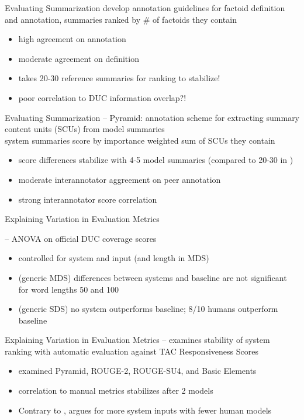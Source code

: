 \documentclass{beamer}
\begin{document}
\begin{frame}{Evaluating Summarization}
\cite{teufel2004evaluating} develop annotation guidelines for factoid 
definition and annotation, summaries ranked by \# of factoids they contain
\begin{itemize}
\item high agreement on annotation
\item moderate agreement on definition
\item takes 20-30 reference summaries for ranking to stabilize!
\item poor correlation to DUC information overlap?!
\end{itemize} 
\end{frame}

\begin{frame}{Evaluating Summarization}
\cite{nenkova2007pyramid} -- Pyramid: annotation scheme for extracting 
    summary content units (SCUs) from model summaries \\
    system summaries score by importance weighted sum of SCUs they contain
\begin{itemize}
\item score differences stabilize with 4-5 model summaries (compared to 
    20-30 in \cite{teufel2004evaluating})
\item moderate interannotator aggreement on peer annotation
\item strong interannotator score correlation 
\end{itemize} 

\end{frame}

\begin{frame}{Explaining Variation in Evaluation Metrics}

\cite{nenkova2005automatic} -- ANOVA on official DUC coverage scores
\begin{itemize}
\item controlled for system and input (and length in MDS)
\item (generic MDS) differences between systems and baseline are not 
    significant for word lengths 50 and 100  
\item  (generic SDS) no system outperforms baseline; 8/10 humans outperform 
    baseline 
\end{itemize}

\end{frame}

\begin{frame}{Explaining Variation in Evaluation Metrics}
\cite{owczarzak2009evaluation} -- examines stability of system ranking with
    automatic evaluation against TAC Responsiveness Scores  
\begin{itemize}
\item examined Pyramid, ROUGE-2, ROUGE-SU4, and Basic Elements
\item correlation to manual metrics stabilizes after 2 models
\item Contrary to \cite{teufel2004evaluating}, argues for more system inputs 
    with fewer human models 
\end{itemize}
\end{frame}
\end{document}
